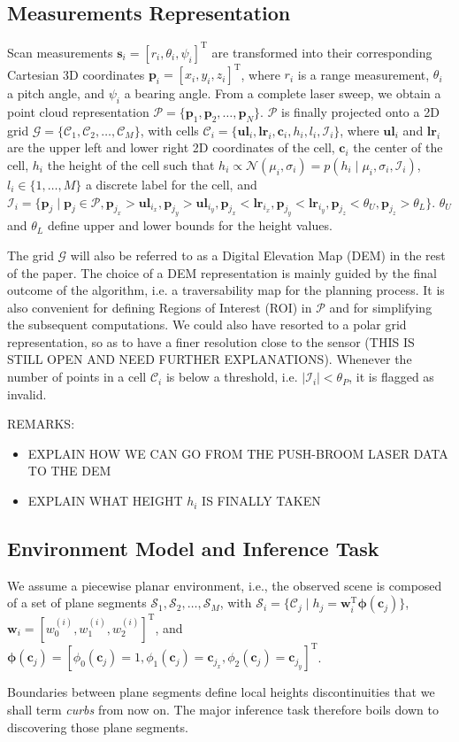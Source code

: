 \subsection{Measurements Representation}
Scan measurements $\mathbf{s}_i=[r_i,\theta_i,\psi_i]^\text{T}$ are transformed
into their corresponding Cartesian 3D coordinates $\mathbf{p}_i=[x_i,y_i,z_i]
^\text{T}$, where $r_i$ is a range measurement, $\theta_i$ a pitch angle, and
$\psi_i$ a bearing angle. From a complete laser sweep, we obtain a point cloud
representation $\mathcal{P}=\{\mathbf{p}_1,\mathbf{p}_2,\dots,\mathbf{p}_N\}$.
$\mathcal{P}$ is finally projected onto a 2D grid $\mathcal{G}=\{\mathcal{C}_1,
\mathcal{C}_2,\dots,\mathcal{C}_M\}$, with cells $\mathcal{C}_i=
\{\mathbf{ul}_i,\mathbf{lr}_i,\mathbf{c}_i,h_i,l_i,\mathcal{I}_i\}$, where
$\mathbf{ul}_i$ and $\mathbf{lr}_i$ are the upper left and lower right 2D
coordinates of the cell, $\mathbf{c}_i$ the center of the cell, $h_i$ the height
of the cell such that $h_i\propto\mathcal{N}(\mu_i,\sigma_i)=p(h_i\mid\mu_i,
\sigma_i,\mathcal{I}_i)$, $l_i\in\{1,\dots,M\}$ a discrete label for the cell,
and $\mathcal{I}_i=\{\mathbf{p}_j\mid\mathbf{p}_j\in\mathcal{P},
\mathbf{p}_{j_x}>\mathbf{ul}_{i_x},\mathbf{p}_{j_y}>\mathbf{ul}_{i_y}
,\mathbf{p}_{j_x}<\mathbf{lr}_{i_x},\mathbf{p}_{j_y}<\mathbf{lr}_{i_y}
,\mathbf{p}_{j_z}<\theta_U,\mathbf{p}_{j_z}>\theta_L\}$. $\theta_U$
and $\theta_L$ define upper and lower bounds for the height values.

The grid $\mathcal{G}$ will also be referred to as a Digital Elevation Map (DEM)
in the rest of the paper. The choice of a DEM representation is mainly guided by
the final outcome of the algorithm, i.e. a traversability map for the planning
process. It is also convenient for defining Regions of Interest (ROI) in
$\mathcal{P}$ and for simplifying the subsequent computations. We could also
have resorted to a polar grid representation, so as to have a finer resolution
close to the sensor (THIS IS STILL OPEN AND NEED FURTHER EXPLANATIONS). Whenever
the number of points in a cell $\mathcal{C}_i$ is below a threshold, i.e.
$|\mathcal{I}_i|<\theta_P$, it is flagged as invalid.

REMARKS:
\begin{itemize}
\item EXPLAIN HOW WE CAN GO FROM THE PUSH-BROOM LASER DATA TO THE DEM
\item EXPLAIN WHAT HEIGHT $h_i$ IS FINALLY TAKEN
\end{itemize}

\subsection{Environment Model and Inference Task}
We assume a piecewise planar environment, i.e., the observed scene is composed
of a set of plane segments $\mathcal{S}_1,\mathcal{S}_2,\dots,\mathcal{S}_M$, with
$\mathcal{S}_i=\{\mathcal{C}_j\mid h_j=\mathbf{w}_i^\text{T}\boldsymbol{\phi}
(\mathbf{c}_{j})\}$, $\mathbf{w}_i=[w_0^{(i)}, w_1^{(i)}, w_2^{(i)}]^\text{T}$,
and $\boldsymbol{\phi}(\mathbf{c}_{j})=[\phi_0(\mathbf{c}_{j})=1,
\phi_1(\mathbf{c}_{j})=\mathbf{c}_{j_x},\phi_2(\mathbf{c}_{j})=
\mathbf{c}_{j_y}]^\text{T}$.

Boundaries between plane segments define local heights discontinuities that we
shall term \emph{curbs} from now on. The major inference task therefore boils
down to discovering those plane segments.

